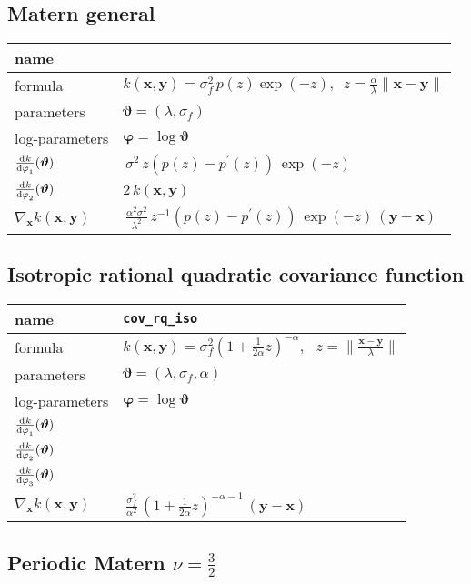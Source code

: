 \documentclass{article}
\newcommand{\NL}{\\ \midrule} %
\newcommand{\bx}{\bm{x}}
\newcommand{\by}{\bm{y}}
\newcommand{\btheta}{\bm{\vartheta}}
\newcommand{\bphi}{\bm{\varphi}}
\begin{document}
\subsection{Matern general}

\begin{tabularx}{\textwidth}{@{} X X @{}}
%
 name &   \NL
 formula &  $\displaystyle k(\bx,\by) = \sigma_f^2 \, p(z)  \exp \left ( -z\right), \,\,\, z = \frac{\alpha}{\lambda}\| \bx-\by \| $ \NL
% 
parameters & $\btheta = (\lambda, \sigma_f )$  \NL
% 
log-parameters & $\displaystyle \bphi = \log \btheta $ \NL
%
$\displaystyle \od{k}{\varphi_1}(\btheta)$ &  $\displaystyle   \, \sigma^2  \, z \left( p(z) -  p^{\prime}(z)  \right) \, \exp(-z) $   \NL
$\displaystyle \od{k}{\varphi_2}(\btheta)$ & $\displaystyle 2  \,k(\bx,\by) $   \NL
%
$\displaystyle \nabla_{\bx} k(\bx, \by)$  &  $\displaystyle   \, \frac{\alpha^2\sigma^2}{\lambda^2}  \, z^{-1} \left( p(z) -  p^{\prime}(z)  \right) \, \exp(-z) \, (\by-\bx) $    \NL 
%
\end{tabularx}













\subsection{Isotropic rational quadratic covariance function}

\begin{tabularx}{\textwidth}{@{} X X @{}}
%
 name &    \verb|cov_rq_iso|   \NL
 formula &  $\displaystyle k(\bx,\by) = \sigma_f^2 \left(     1+\frac{1}{2\alpha}z  \right)^{-\alpha}, \,\,\,\, z = \|  \frac{\bx-\by}{\lambda}  \|  $ \NL
% 
parameters & $\btheta = (\lambda, \sigma_f , \alpha)$  \NL
% 
log-parameters & $\displaystyle \bphi = \log \btheta $ \NL
%
$\displaystyle \od{k}{\varphi_1}(\btheta)$ &     \NL
$\displaystyle \od{k}{\varphi_2}(\btheta)$ &     \NL
$\displaystyle \od{k}{\varphi_3}(\btheta)$ &     \NL
%
$\displaystyle \nabla_{\bx} k(\bx, \by)$ &  $\displaystyle   \, \frac{\sigma_f^2}{\alpha^2}   \, \left(     1+\frac{1}{2\alpha}z  \right)^{-\alpha-1}  \, (\by-\bx) $    \NL 
%
\end{tabularx}




\subsection{Periodic Matern $\nu = \frac{3}{2}$}
\end{document}
